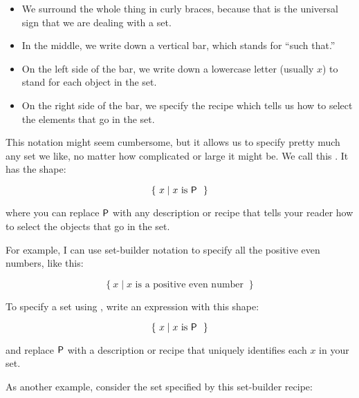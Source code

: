 \documentclass[../../../main.tex]{subfiles}
\begin{document}
\begin{itemize}

  \item We surround the whole thing in curly braces, because that is the universal sign that we are dealing with a set.

  \item In the middle, we write down a vertical bar, which stands for ``such that.''
  
  \item On the left side of the bar, we write down a lowercase letter (usually $x$) to stand for each object in the set.
    
  \item On the right side of the bar, we specify the recipe which tells us how to select the elements that go in the set.
  
\end{itemize}

This notation might seem cumbersome, but it allows us to specify pretty much any set we like, no matter how complicated or large it might be. We call this . It has the shape:

\begin{equation*}
  \{~x \mid \text{$x$ is $\P/$ }~\}
\end{equation*}

\noindent
where you can replace $\P/$ with any description or recipe that tells your reader how to select the objects that go in the set.

For example, I can use set-builder notation to specify all the positive even numbers, like this:

\begin{equation*}
  \{~x \mid \text{$x$ is a positive even number }~\}
\end{equation*}

\begin{terminology}
  To specify a set using , write an expression with this shape:

\begin{equation*}
  \{~x \mid \text{$x$ is $\P/$ }~\}
\end{equation*}

\noindent
and replace $\P/$ with a description or recipe that uniquely identifies each $x$ in your set.  
\end{terminology}

As another example, consider the set specified by this set-builder recipe:
\end{document}
